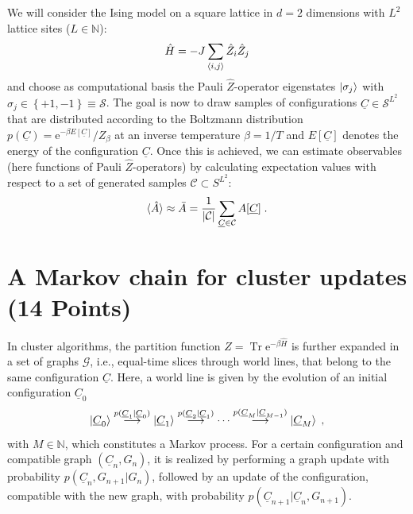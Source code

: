 \documentclass[a4paper, 12pt]{article}
\begin{document}
%
We will consider the Ising model on a square lattice in $d=2$ dimensions with $L^2$ lattice sites ($L\in\mathbb N$):
\begin{equation}
	\hat H = -J \sum_{\braket{i,j}} \hat Z_i \hat Z_j
\end{equation}
and choose as computational basis the Pauli $\hat Z$-operator eigenstates $\ket{\sigma_j}$ with $\sigma_j \in \left\{+1, -1 \right\} \equiv \mathcal S$.
%
The goal is now to draw samples of configurations $\underline C \in \mathcal S^{L^2}$ that are distributed according to the Boltzmann distribution $p(\underline C) = \mathrm{e}^{-\beta E[\underline C]}/Z_\beta$ at an inverse temperature $\beta = 1/T$ and $E[\underline C]$ denotes the energy of the configuration $\underline C$.
%
Once this is achieved, we can estimate observables (here functions of Pauli $\hat Z$-operators) by calculating expectation values with respect to a set of generated samples $\mathcal C \subset S^{L^2}$:
\begin{equation}
	\braket{\hat A} \approx \bar A = \frac{1}{\lvert \mathcal C \rvert} \sum_{\underline C \in \mathcal C} A[\underline C] \; .
\end{equation}
%
\section{A Markov chain for cluster updates \textbf{(14 Points)}}
%
In cluster algorithms, the partition function $Z=\operatorname{Tr} \mathrm{e}^{-\beta \hat H}$ is further expanded in a set of graphs $\mathcal G$, i.e., equal-time slices through world lines, that belong to the same configuration $\underline C$.
%
Here, a world line is given by the evolution of an initial configuration $\underline C_0$
\begin{equation}
	\ket{\underline C_0} \stackrel{p(\underline C_1|\underline C_0)}{\longrightarrow} \ket{\underline C_1} \stackrel{p(\underline C_2|\underline C_1)}{\longrightarrow} \cdots \stackrel{p(\underline C_M|\underline C_{M-1})}{\longrightarrow} \ket{\underline C_M} \; ,
\end{equation}
with $M\in\mathbb N$, which constitutes a Markov process.
%
For a certain configuration and compatible graph $(\underline C_n, G_n)$, it is realized by performing a graph update with probability $p(\underline C_n, G_{n+1} | G_{n})$, followed by an update of the configuration, compatible with the new graph, with probability $p(\underline C_{n+1}|\underline C_n, G_{n+1})$.
%
\end{document}
